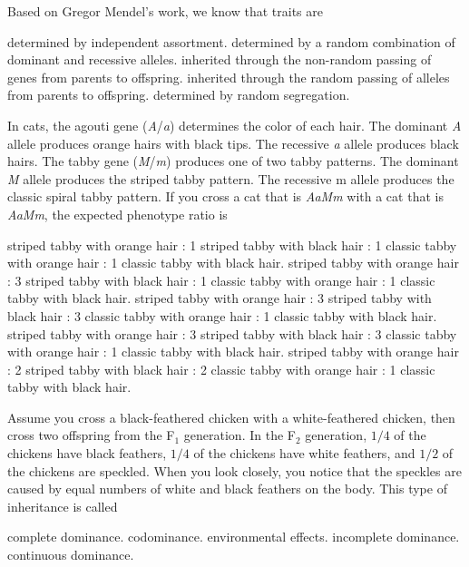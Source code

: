 
\question
Based on Gregor Mendel's work, we know that traits are

\begin{choices}
\choice determined by independent assortment.
\choice determined by a random combination of dominant and recessive alleles.
\choice inherited through the non-random passing of genes from parents to offspring.
\correctchoice inherited through the random passing of alleles from parents to offspring.
\choice determined by random segregation.
\end{choices}

\question
In cats, the agouti gene (\textit{A}/\textit{a}) determines the color of each hair. The dominant \textit{A} allele produces orange hairs with black tips.  The recessive \textit{a} allele produces black hairs.  The tabby gene (\textit{M}/\textit{m}) produces one of two tabby patterns.  The dominant \textit{M} allele produces the striped tabby pattern.  The recessive m allele produces the classic spiral tabby pattern. If you cross a cat that is \textit{AaMm} with a cat that is \textit{AaMm}, the expected phenotype ratio is

\begin{choices}
 striped tabby with orange hair : 1 striped tabby with black hair : 1 classic tabby with orange hair : 1 classic tabby with black hair.
 striped tabby with orange hair : 3 striped tabby with black hair : 1 classic tabby with orange hair : 1 classic tabby with black hair.
 striped tabby with orange hair : 3 striped tabby with black hair : 3 classic tabby with orange hair : 1 classic tabby with black hair.
 striped tabby with orange hair : 3 striped tabby with black hair : 3 classic tabby with orange hair : 1 classic tabby with black hair. 
 striped tabby with orange hair : 2 striped tabby with black hair : 2 classic tabby with orange hair : 1 classic tabby with black hair.
\end{choices}

\question
Assume you cross a black-feathered chicken with a white-feathered chicken, then cross two offspring from the F$_1$ generation.  In the F$_2$ generation, $1/4$ of the chickens have black feathers, $1/4$ of the chickens have white feathers, and $1/2$ of the chickens are speckled.  When you look closely, you notice that the speckles are caused by equal numbers of white and black feathers on the body. This type of inheritance is called

\begin{choices}
\choice complete dominance.
\correctchoice codominance.
\choice environmental effects.
\choice incomplete dominance.
\choice continuous dominance.
\end{choices}

